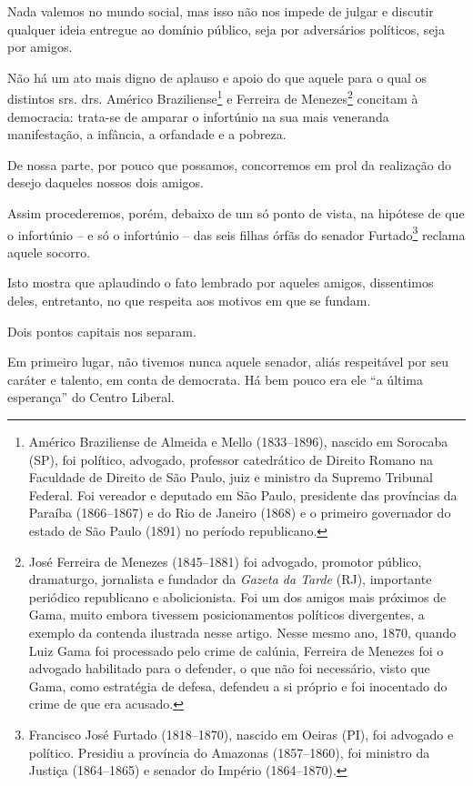 {\asterisc{}

Nada valemos no mundo social, mas isso não nos impede de julgar e
discutir qualquer ideia entregue ao domínio público, seja por
adversários políticos, seja por amigos.

Não há um ato mais digno de aplauso e apoio do que aquele para o qual os
distintos srs. drs. Américo Braziliense\footnote{ Américo Braziliense
  de Almeida e Mello (1833--1896), nascido em Sorocaba (SP), foi
  político, advogado, professor catedrático de Direito Romano na
  Faculdade de Direito de São Paulo, juiz e ministro da Supremo Tribunal
  Federal. Foi vereador e deputado em São Paulo, presidente das
  províncias da Paraíba (1866--1867) e do Rio de Janeiro (1868) e o
  primeiro governador do estado de São Paulo (1891) no período
  republicano.} e Ferreira de Menezes\footnote{ José Ferreira de
  Menezes (1845--1881) foi advogado, promotor público, dramaturgo,
  jornalista e fundador da \emph{Gazeta da Tarde} (RJ), importante
  periódico republicano e abolicionista. Foi um dos amigos mais próximos
  de Gama, muito embora tivessem posicionamentos políticos divergentes,
  a exemplo da contenda ilustrada nesse artigo. Nesse mesmo ano, 1870,
  quando Luiz Gama foi processado pelo crime de calúnia, Ferreira de
  Menezes foi o advogado habilitado para o defender, o que não foi
  necessário, visto que Gama, como estratégia de defesa, defendeu a si
  próprio e foi inocentado do crime de que era acusado.} concitam à
democracia: trata-se de amparar o infortúnio na sua mais veneranda
manifestação, a infância, a orfandade e a pobreza.

De nossa parte, por pouco que possamos, concorremos em prol da
realização do desejo daqueles nossos dois amigos.

Assim procederemos, porém, debaixo de um só ponto de vista, na hipótese
de que o infortúnio -- e só o infortúnio -- das seis filhas órfãs do
senador Furtado\footnote{ Francisco José Furtado (1818--1870), nascido
  em Oeiras (PI), foi advogado e político. Presidiu a província do
  Amazonas (1857--1860), foi ministro da Justiça (1864--1865) e senador do
  Império (1864--1870).} reclama aquele socorro.

Isto mostra que aplaudindo o fato lembrado por aqueles amigos,
dissentimos deles, entretanto, no que respeita aos motivos em que se
fundam.

Dois pontos capitais nos separam.

Em primeiro lugar, não tivemos nunca aquele senador, aliás respeitável
por seu caráter e talento, em conta de democrata. Há bem pouco era ele
``a última esperança'' do Centro Liberal.

}
